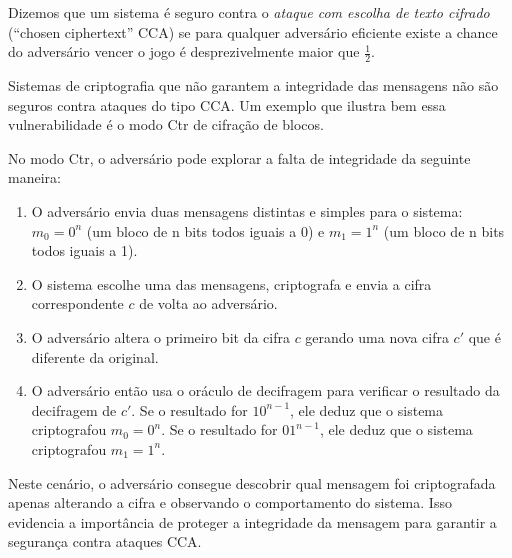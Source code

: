 \begin{center}
\end{center}

Dizemos que um sistema é seguro contra o {\em ataque com escolha de texto cifrado} (``chosen ciphertext'' CCA) se para qualquer adversário eficiente existe a chance do adversário vencer o jogo é desprezivelmente maior que $\frac{1}{2}$.

Sistemas de criptografia que não garantem a integridade das mensagens não são seguros contra ataques do tipo CCA.
Um exemplo que ilustra bem essa vulnerabilidade é o modo Ctr de cifração de blocos.

No modo Ctr, o adversário pode explorar a falta de integridade da seguinte maneira:
\begin{enumerate}
\item  O adversário  envia duas mensagens distintas e simples para o sistema: 
$m_0 = 0^n$ (um bloco de n bits todos iguais a 0) e $m_1 = 1^n$ (um bloco de n bits todos iguais a 1).
\item O sistema escolhe uma das mensagens, criptografa e envia a cifra correspondente $c$ de volta ao adversário.
\item O adversário altera o primeiro bit da cifra $c$ gerando uma nova cifra $c'$ que é diferente da original.
\item O adversário então usa o oráculo de decifragem para verificar o resultado da decifragem de $c'$.
  Se o resultado for $10^{n-1}$, ele deduz que o sistema criptografou $m_0 = 0^n$.
  Se o resultado for $01^{n-1}$, ele deduz que o sistema criptografou $m_1 = 1^n$.
\end{enumerate}

Neste cenário, o adversário consegue descobrir qual mensagem foi criptografada apenas alterando a cifra e observando o comportamento do sistema.
Isso evidencia a importância de proteger a integridade da mensagem para garantir a segurança contra ataques CCA.

